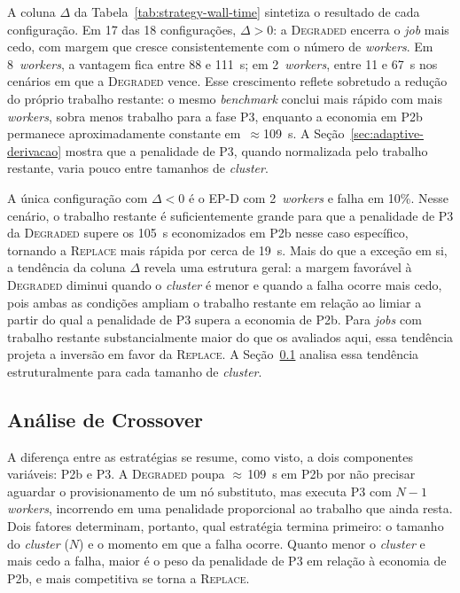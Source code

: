 A coluna $\Delta$ da Tabela~\ref{tab:strategy-wall-time} sintetiza o resultado de
cada configuração. Em 17 das 18 configurações, $\Delta > 0$: a \textsc{Degraded}
encerra o \textit{job} mais cedo, com margem que cresce consistentemente com o
número de \textit{workers}. Em 8~\textit{workers}, a vantagem fica entre 88 e
111~s; em 2~\textit{workers}, entre 11 e 67~s nos cenários em que a
\textsc{Degraded} vence.
Esse crescimento reflete sobretudo a redução do próprio trabalho restante: o
mesmo \textit{benchmark} conclui mais rápido com mais \textit{workers}, sobra
menos trabalho para a fase P3, enquanto a economia em P2b permanece
aproximadamente constante em~$\approx$109~s. A
Seção~\ref{sec:adaptive-derivacao} mostra que a penalidade de P3, quando
normalizada pelo trabalho restante, varia pouco entre tamanhos de
\textit{cluster}.

A única configuração com $\Delta < 0$ é o EP-D com 2~\textit{workers} e falha em
10\%. Nesse cenário, o trabalho restante é suficientemente grande para que a
penalidade de P3 da \textsc{Degraded} supere os 105~s economizados em P2b nesse caso
específico, tornando a \textsc{Replace} mais rápida por cerca de 19~s. Mais do que a exceção em si, a
tendência da coluna $\Delta$ revela uma estrutura geral: a margem favorável à
\textsc{Degraded} diminui quando o \textit{cluster} é menor e quando a falha ocorre
mais cedo, pois ambas as condições ampliam o trabalho restante em relação ao limiar
a partir do qual a penalidade de P3 supera a economia de P2b. Para \textit{jobs}
com trabalho restante substancialmente maior do que os avaliados aqui, essa tendência
projeta a inversão em favor da \textsc{Replace}. A Seção~\ref{sec:crossover}
analisa essa tendência estruturalmente para cada tamanho de \textit{cluster}.

\subsection{Análise de Crossover}
\label{sec:crossover}

A diferença entre as estratégias se resume, como visto, a dois componentes variáveis:
P2b e P3. A \textsc{Degraded} poupa $\approx$\,109~s em P2b por não precisar aguardar
o provisionamento de um nó substituto, mas executa P3 com $N{-}1$ \textit{workers},
incorrendo em uma penalidade proporcional ao trabalho que ainda resta. Dois fatores
determinam, portanto, qual estratégia termina primeiro: o tamanho do \textit{cluster}
($N$) e o momento em que a falha ocorre. Quanto menor o \textit{cluster} e mais cedo
a falha, maior é o peso da penalidade de P3 em relação à economia de P2b, e mais
competitiva se torna a \textsc{Replace}.


